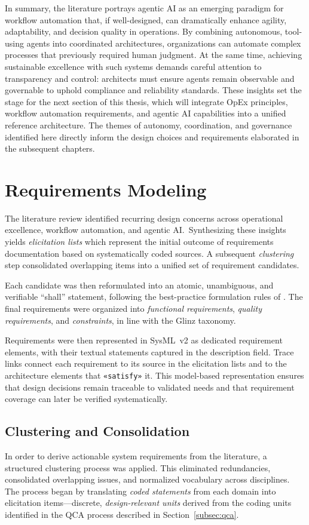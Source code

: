 In summary, the literature portrays agentic AI as an emerging paradigm for workflow automation that, if well-designed, can dramatically enhance agility, adaptability, and decision quality in operations. By combining autonomous, tool-using agents into coordinated architectures, organizations can automate complex processes that previously required human judgment. At the same time, achieving sustainable excellence with such systems demands careful attention to transparency and control: architects must ensure agents remain observable and governable to uphold compliance and reliability standards. These insights set the stage for the next section of this thesis, which will integrate OpEx principles, workflow automation requirements, and agentic AI capabilities into a unified reference architecture. The themes of autonomy, coordination, and governance identified here directly inform the design choices and requirements elaborated in the subsequent chapters.

\section{Requirements Modeling}\label{sec:mod-req}
The literature review identified recurring design concerns across operational excellence, workflow automation, and agentic AI.~Synthesizing these insights yields \emph{elicitation lists} which represent the initial outcome of requirements documentation based on systematically coded sources. A subsequent \emph{clustering} step consolidated overlapping items into a unified set of requirement candidates.

Each candidate was then reformulated into an atomic, unambiguous, and verifiable “shall” statement, following the best-practice formulation rules of \textcite{glinzHandbook2020}. The final requirements were organized into \emph{functional requirements}, \emph{quality requirements}, and \emph{constraints}, in line with the Glinz taxonomy.

Requirements were then represented in SysML~v2 as dedicated requirement elements, with their textual statements captured in the description field. Trace links connect each requirement to its source in the elicitation lists and to the architecture elements that \texttt{«satisfy»} it. This model-based representation ensures that design decisions remain traceable to validated needs and that requirement coverage can later be verified systematically. \\

\subsection{Clustering and Consolidation}
In order to derive actionable system requirements from the literature, a structured clustering process was applied. This eliminated redundancies, consolidated overlapping issues, and normalized vocabulary across disciplines. The process began by translating \emph{coded statements} from each domain into elicitation items—discrete, \emph{design-relevant units} derived from the coding units identified in the QCA process described in Section~\ref{subsec:qca}.~\\

